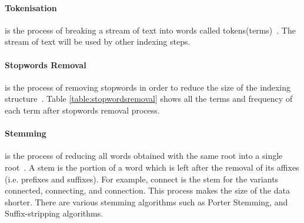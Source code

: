 \paragraph{Tokenisation}
is the process of breaking a stream of text into words called tokens(terms)~\cite{tokenization}. The stream of text will be used by other indexing steps.

\paragraph{Stopwords Removal}
is the process of removing stopwords in order to reduce the size of the indexing structure~\cite[P. 15]{IRarchitecture}.
Table \ref{table:stopwordsremoval} shows all the terms and frequency of each term after stopwords removal process.

\begin{table}
\centering
{}
\caption{Terms and Frequency After Stopwords Removal} \label{table:stopwordsremoval}
\end{table}

\paragraph{Stemming} is the process of reducing all words obtained with the same root into a single root~\cite[P. 20]{IRarchitecture}. 
A stem is the portion of a word which is left after
the removal of its affixes (i.e. prefixes and suffixes). For example, connect is the stem for the variants connected, connecting, and connection.
This process makes the size of the data shorter. There are various stemming algorithms such as Porter Stemming, and Suffix-stripping algorithms.

